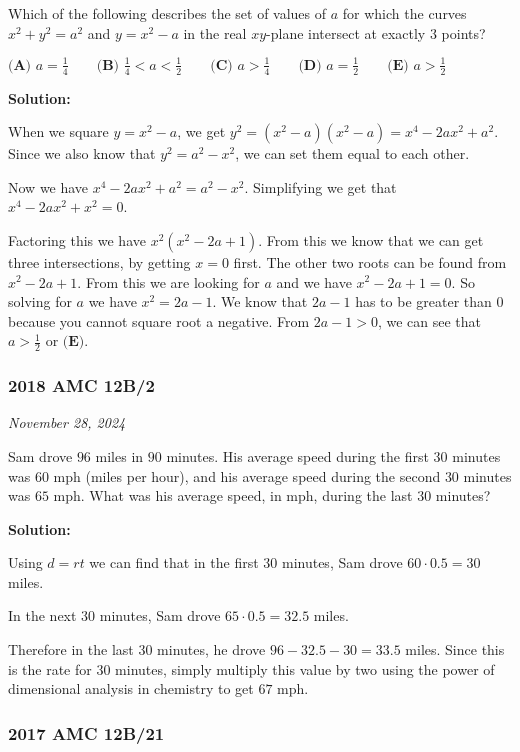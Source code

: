 \documentclass[../mathproblems.tex]{subfiles}
\begin{document}
Which of the following describes the set of values of $a$ for which the curves $x^2+y^2=a^2$ and $y=x^2-a$ in the real $xy$-plane intersect at exactly $3$ points?

$ \textbf{(A) }a=\frac14 \qquad \textbf{(B) }\frac14 < a < \frac12 \qquad \textbf{(C) }a>\frac14 \qquad \textbf{(D) }a=\frac12 \qquad \textbf{(E) }a>\frac12 \qquad $

\textbf{Solution:}

When we square $y=x^2-a$, we get $y^2=(x^2-a)(x^2-a) = x^4-2ax^2+a^2$. Since we also know that $y^2=a^2-x^2$, we can set them equal to each other.

Now we have $x^4-2ax^2+a^2=a^2-x^2$. Simplifying we get that $x^4-2ax^2+x^2=0$.

Factoring this we have $x^2(x^2-2a+1)$. From this we know that we can get three intersections, by getting $x=0$ first. The other two roots can be found from $x^2-2a+1$. From this we are looking for $a$ and we have $x^2-2a+1=0$. So solving for $a$ we have $x^2=2a-1$. We know that $2a-1$ has to be greater than $0$ because you cannot square root a negative. From $2a-1>0$, we can see that $a>\frac{1}{2}$ or $\boxed{ \textbf{(E)} }$.

\noindent\hrulefill




\subsubsection*{2018 AMC 12B/2} 
\textit{November 28, 2024}

Sam drove $96$ miles in $90$ minutes. His average speed during the first $30$ minutes was $60$ mph (miles per hour), and his average speed during the second $30$ minutes was $65$ mph. What was his average speed, in mph, during the last $30$ minutes?

\textbf{Solution:}

Using $d=rt$ we can find that in the first $30$ minutes, Sam drove $60\cdot 0.5 = 30$ miles.

In the next $30$ minutes, Sam drove $65 \cdot 0.5 = 32.5$ miles.

Therefore in the last 30 minutes, he drove $96-32.5-30=33.5$ miles. Since this is the rate for 30 minutes, simply multiply this value by two using the power of dimensional analysis in chemistry to get $\boxed{67}$ mph.

\noindent\hrulefill
\subsubsection*{2017 AMC 12B/21} 
\end{document}
